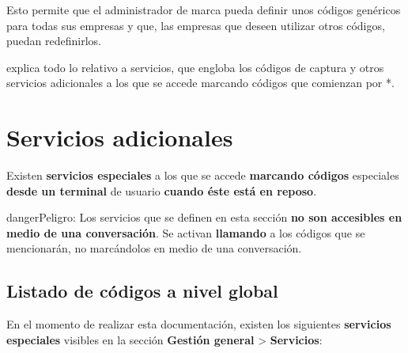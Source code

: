 \documentclass[letterpaper,10pt,spanish]{sphinxmanual}
\begin{document}
Esto permite que el administrador de marca pueda definir unos códigos genéricos para todas sus empresas y que, las empresas que deseen utilizar otros códigos, puedan redefinirlos.

{\hyperref[pbx_features/services:services]{}} explica todo lo relativo a servicios, que engloba los códigos de captura y otros servicios adicionales a los que se accede marcando códigos que comienzan por *.


\section{Servicios adicionales}
\label{pbx_features/services:services}\label{pbx_features/services:additional-services}\label{pbx_features/services::doc}
Existen \textbf{servicios especiales} a los que se accede \textbf{marcando códigos} especiales \textbf{desde un terminal} de usuario \textbf{cuando éste está en reposo}.

\begin{notice}{danger}{Peligro:}
Los servicios que se definen en esta sección \textbf{no son accesibles en medio de una conversación}. Se activan \textbf{llamando} a los códigos que se mencionarán, no marcándolos en medio de una conversación.
\end{notice}


\subsection{Listado de códigos a nivel global}
\label{pbx_features/services:global-services-codes}
En el momento de realizar esta documentación, existen los siguientes \textbf{servicios especiales} visibles en la sección \textbf{Gestión general} \textgreater{} \textbf{Servicios}:
\end{document}

